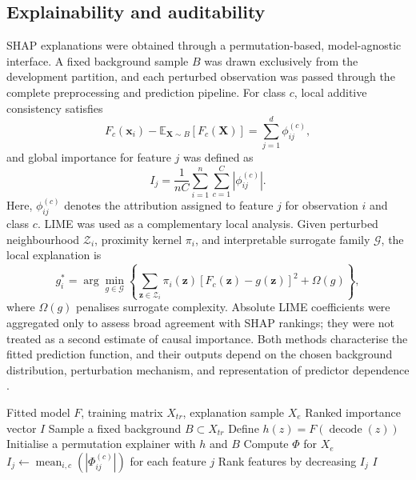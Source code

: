 ﻿\documentclass[preprint,12pt]{elsarticle}
\begin{document}
\subsection{Explainability and auditability}
SHAP explanations were obtained through a permutation-based, model-agnostic interface. A fixed background sample $B$ was drawn exclusively from the development partition, and each perturbed observation was passed through the complete preprocessing and prediction pipeline. For class $c$, local additive consistency satisfies
\begin{equation}
F_c(\mathbf{x}_i)-\mathbb{E}_{\mathbf{X}\sim B}[F_c(\mathbf{X})]
=\sum_{j=1}^{d}\phi_{ij}^{(c)},
\label{eq:shaplocal}
\end{equation}
and global importance for feature $j$ was defined as
\begin{equation}
I_j=\frac{1}{nC}\sum_{i=1}^{n}\sum_{c=1}^{C}|\phi_{ij}^{(c)}|.
\label{eq:shapglobal}
\end{equation}
Here, $\phi_{ij}^{(c)}$ denotes the attribution assigned to feature $j$ for observation $i$ and class $c$. LIME was used as a complementary local analysis. Given perturbed neighbourhood $\mathcal{Z}_i$, proximity kernel $\pi_i$, and interpretable surrogate family $\mathcal{G}$, the local explanation is
\begin{equation}
g_i^{*}=\arg\min_{g\in\mathcal{G}}
\left\{\sum_{\mathbf{z}\in\mathcal{Z}_i}\pi_i(\mathbf{z})
[F_c(\mathbf{z})-g(\mathbf{z})]^2+\Omega(g)\right\},
\label{eq:lime}
\end{equation}
where $\Omega(g)$ penalises surrogate complexity. Absolute LIME coefficients were aggregated only to assess broad agreement with SHAP rankings; they were not treated as a second estimate of causal importance. Both methods characterise the fitted prediction function, and their outputs depend on the chosen background distribution, perturbation mechanism, and representation of predictor dependence \cite{instanceshap2023,jung2023}.

\begin{algorithm}[H]
\caption{Permutation-SHAP procedure for global model auditing}
\label{alg:shap}
\begin{algorithmic}[1]
\Require Fitted model $F$, training matrix $X_{tr}$, explanation sample $X_e$
\Ensure Ranked importance vector $I$
\State Sample a fixed background $B\subset X_{tr}$
\State Define $h(z)=F(\operatorname{decode}(z))$
\State Initialise a permutation explainer with $h$ and $B$
\State Compute $\Phi$ for $X_e$
\State $I_j\gets\operatorname{mean}_{i,c}(|\Phi_{ij}^{(c)}|)$ for each feature $j$
\State Rank features by decreasing $I_j$
\State \Return $I$
\end{algorithmic}
\end{algorithm}
\end{document}
